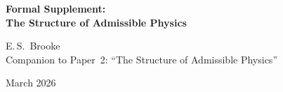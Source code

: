 \documentclass[11pt,a4paper]{article}
\theoremstyle{definition}
\begin{document}

\begin{center}
{\LARGE\bfseries Formal Supplement:\\[4pt]
The Structure of Admissible Physics}

\bigskip
{\large E.\,S.\ Brooke}\\[4pt]
{\small Companion to Paper~2: ``The Structure of Admissible Physics''}

\bigskip
{\small March 2026}
\end{center}

\bigskip


\end{document}
